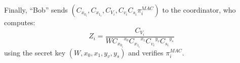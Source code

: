 \documentclass{article}
\begin{document}

Finally, ``Bob'' sends $(C_{x_{0_i}}, C_{x_{1_i}}, C_{V_i}, C_{v_i} C_{s_i} \pi_i^{\mathit{MAC}})$ to the coordinator, who computes:
\[
Z_i=\frac{C_{V_i}}{W {C_{x_{0_i}}}^{x_0} {C_{x_{1_i}}}^{x_{1}}
{C_{v_i}}^{y_v} {C_{s_i}}^{y_s} %
}
\]
using the secret key $(W, x_{0}, x_{1}, y_v, y_s)$ and verifies $\pi_i^{\mathit{MAC}}$.




\end{document}
